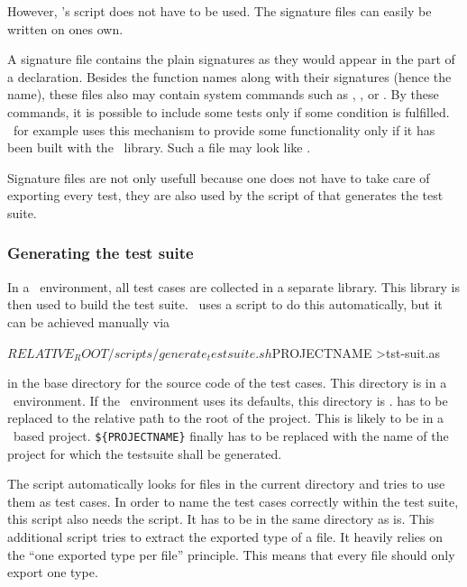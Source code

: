 However, \LibModel's script does not have to be used. The signature files can easily be written on ones own.

A signature file contains the plain signatures as they would appear in the  part of a declaration. Besides the function names along with their signatures (hence the name), these files also may contain system commands such as , , or . By these commands, it is possible to include some tests only if some condition is fulfilled. \projectname~for example uses this mechanism to provide some functionality only if it has been built with the \LibAlgebra~library. Such a file may look like .


Signature files are not only usefull because one does not have to take care of exporting every test, they are also used by the script of \LibModel that generates the test suite.

\subsubsection{Generating the test suite}

In a \LibModel~environment, all test cases are collected in a separate library. This library is then used to build the test suite. \LibModel~uses a script to do this automatically, but it can be achieved manually via
\begin{console}
${RELATIVE_ROOT}/scripts/generate_testsuite.sh ${PROJECTNAME} >tst-suit.as
\end{console}
in the base directory for the source code of the test cases. This directory is  in a \LibModel~environment. If the \LibModel~environment uses its defaults, this directory is .  has to be replaced to the relative path to the root of the project. This is likely to be  in a \LibModel~based project. {\tt\$\{PROJECTNAME\}} finally has to be replaced with the name of the project for which the testsuite shall be generated.

The script automatically looks for  files in the current directory and tries to use them as test cases. In order to name the test cases correctly within the test suite, this script also needs the  script. It has to be in the same directory as  is. This additional script tries to extract the exported type of a file. It heavily relies on the ``one exported type per file'' principle. This means that every file should only export one type. 

